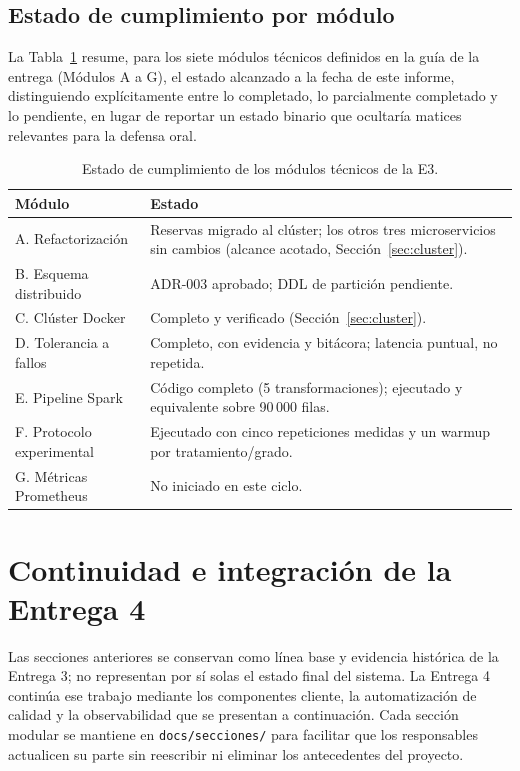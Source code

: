 \documentclass[10pt,twocolumn]{article}
\begin{document}
\subsection{Estado de cumplimiento por módulo}

La Tabla~\ref{tab:modulos} resume, para los siete módulos técnicos
definidos en la guía de la entrega (Módulos A a G), el estado alcanzado a
la fecha de este informe, distinguiendo explícitamente entre lo completado,
lo parcialmente completado y lo pendiente, en lugar de reportar un estado
binario que ocultaría matices relevantes para la defensa oral.

\begin{table}[t]
\centering
\caption{Estado de cumplimiento de los módulos técnicos de la E3.}
\label{tab:modulos}
\small
\begin{tabular}{@{}p{2.6cm}p{5cm}@{}}
\toprule
\textbf{Módulo} & \textbf{Estado} \\
\midrule
A. Refactorización & Reservas migrado al clúster; los otros tres
microservicios sin cambios (alcance acotado, Sección~\ref{sec:cluster}). \\
B. Esquema distribuido & ADR-003 aprobado; DDL de partición pendiente. \\
C. Clúster Docker & Completo y verificado (Sección~\ref{sec:cluster}). \\
D. Tolerancia a fallos & Completo, con evidencia y bitácora; latencia
puntual, no repetida. \\
E. Pipeline Spark & Código completo (5 transformaciones); ejecutado y
equivalente sobre 90\,000 filas. \\
F. Protocolo experimental & Ejecutado con cinco repeticiones medidas y un
warmup por tratamiento/grado. \\
G. Métricas Prometheus & No iniciado en este ciclo. \\
\bottomrule
\end{tabular}
\end{table}

\section{Continuidad e integración de la Entrega 4}
\label{sec:integracion-e4}

Las secciones anteriores se conservan como línea base y evidencia histórica
de la Entrega 3; no representan por sí solas el estado final del sistema.
La Entrega 4 continúa ese trabajo mediante los componentes cliente, la
automatización de calidad y la observabilidad que se presentan a
continuación. Cada sección modular se mantiene en
\texttt{docs/secciones/} para facilitar que los responsables actualicen su
parte sin reescribir ni eliminar los antecedentes del proyecto.
\end{document}
